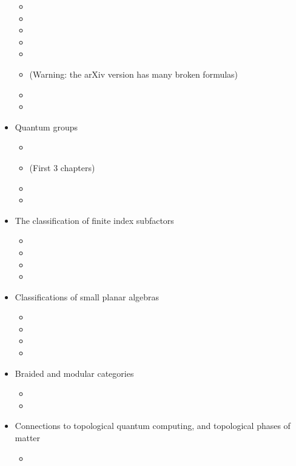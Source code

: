 \documentclass[12pt]{amsart}
\begin{document}
\begin{itemize}
  \begin{itemize}
  \item {}
  \item {}
  \item {}
  \item {}
  \item {}
  \item {} (Warning: the arXiv version has many broken formulas)
  \item {}
  \item {}
  \end{itemize}
\item Quantum groups
  \begin{itemize}
  \item {}
  \item {} (First 3 chapters)
  \item {}
  \item {}
  \end{itemize}
\item The classification of finite index subfactors
  \begin{itemize}
  \item {}
  \item {}
  \item {}
  \item {}
  \end{itemize}
\item Classifications of small planar algebras
  \begin{itemize}
   \item {}
   \item {}
   \item {}
   \item {}
  \end{itemize}
\item Braided and modular categories
  \begin{itemize}
    \item {}
    \item {}
  \end{itemize}
\item Connections to topological quantum computing, and topological phases of matter
  \begin{itemize}
    \item {}
    
  \end{itemize}
\end{itemize}





\end{document}
